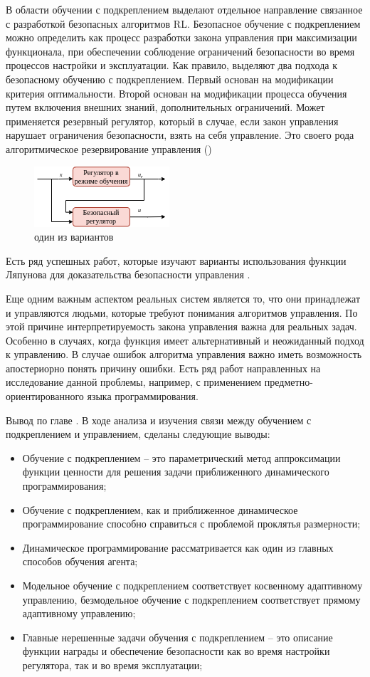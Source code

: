 В области обучении с подкреплением выделают отдельное направление связанное с разработкой безопасных алгоритмов RL. Безопасное обучение с подкреплением можно определить как процесс разработки закона управления при максимизации функционала, при обеспечении соблюдение ограничений безопасности во время процессов настройки и эксплуатации. Как правило, выделяют два подхода к безопасному обучению с подкреплением.
Первый основан на модификации критерия оптимальности. Второй основан на модификации процесса обучения путем включения внешних знаний, дополнительных ограничений. Может применяется резервный регулятор, который в случае, если закон управления нарушает ограничения безопасности, взять на себя управление. Это своего рода алгоритмическое резервирование управления ()
\begin{figure}[ht!] 
	\centering
	\includegraphics[width=0.4\linewidth]{my_folder/figure/schema/safe_RL.png}
	\caption{один из вариантов}
	\label{fig:r_safe_rl-ch2}
\end{figure}

Есть ряд успешных работ, которые изучают варианты использования функции Ляпунова для доказательства безопасности управления \cite{chow2018lyapunovbased}.

Еще одним важным аспектом реальных систем является то, что они принадлежат и управляются людьми, которые требуют понимания алгоритмов управления. По этой причине интерпретируемость закона управления важна для реальных задач. Особенно в случаях, когда функция имеет альтернативный и неожиданный подход к управлению. В случае ошибок алгоритма управления важно иметь возможность апостериорно понять причину ошибки. Есть ряд работ направленных на исследование данной проблемы, например, с применением предметно-ориентированного языка программирования.

Вывод по главе \thechapter. В ходе анализа и изучения связи между обучением с подкреплением и управлением, сделаны следующие выводы:
\begin{itemize}
	
	\item Обучение с подкреплением -- это параметрический метод аппроксимации функции ценности для решения задачи приближенного динамического программирования;
	\item Обучение с подкреплением, как и приближенное динамическое программирование способно справиться с проблемой проклятья размерности;
	\item Динамическое программирование рассматривается как один из главных способов обучения агента;
	\item Модельное обучение с подкреплением соответствует косвенному адаптивному управлению, безмодельное обучение с подкреплением соответствует прямому адаптивному управлению;
	\item Главные нерешенные задачи обучения с подкреплением -- это описание функции награды и обеспечение безопасности как во время настройки регулятора, так и во время эксплуатации;
\end{itemize}